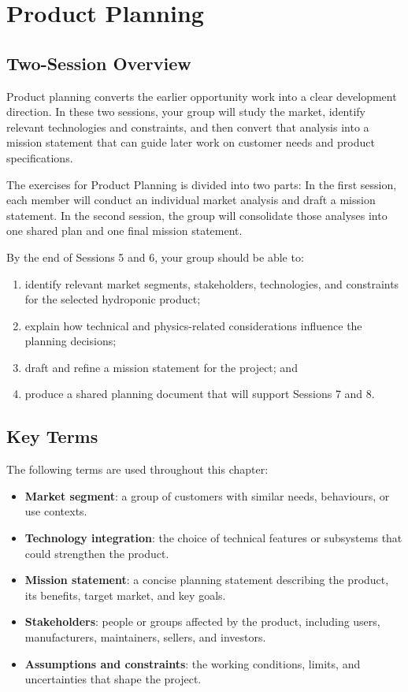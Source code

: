 \chapter{Product Planning}

\section{Two-Session Overview}

Product planning converts the earlier opportunity work into a clear development direction. In these two sessions, your group will study the market, identify relevant technologies and constraints, and then convert that analysis into a mission statement that can guide later work on customer needs and product specifications.

The exercises for Product Planning is divided into two parts: In the first session, each member will conduct an individual market analysis and draft a mission statement. In the second session, the group will consolidate those analyses into one shared plan and one final mission statement.

By the end of Sessions 5 and 6, your group should be able to:
\begin{enumerate}
    \item identify relevant market segments, stakeholders, technologies, and constraints for the selected hydroponic product;
    \item explain how technical and physics-related considerations influence the planning decisions;
    \item draft and refine a mission statement for the project; and
    \item produce a shared planning document that will support Sessions 7 and 8.
\end{enumerate}

\section{Key Terms}

The following terms are used throughout this chapter:
\begin{itemize}
    \item \textbf{Market segment}: a group of customers with similar needs, behaviours, or use contexts.
    \item \textbf{Technology integration}: the choice of technical features or subsystems that could strengthen the product.
    \item \textbf{Mission statement}: a concise planning statement describing the product, its benefits, target market, and key goals.
    \item \textbf{Stakeholders}: people or groups affected by the product, including users, manufacturers, maintainers, sellers, and investors.
    \item \textbf{Assumptions and constraints}: the working conditions, limits, and uncertainties that shape the project.
\end{itemize}

